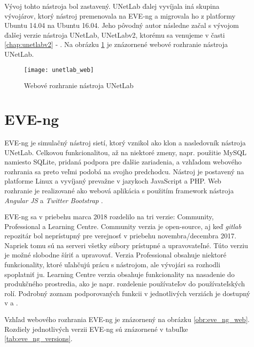 Vývoj tohto nástroja bol zastavený. UNetLab ďalej vyvíjala iná skupina vývojárov, ktorý nástroj premenovala na EVE-ng a migrovala ho z platformy Ubuntu 14.04 na Ubuntu 16.04. Jeho pôvodný autor následne začal s vývojom ďalšej verzie nástroja UNetLab, UNetLabv2, ktorému sa venujeme v časti \ref{chap:unetlabv2} - . Na obrázku \ref{obr:unetlab_web} je znázornené webové rozhranie nástroja UNetLab.

\begin{figure}
    \centering
    \texttt{[image: unetlab\_web]}
    \caption{Webové rozhranie nástroja UNetLab}
    \cite{obr_unetlab_web}
    \label{obr:unetlab_web}
\end{figure}





\section{EVE-ng}
\label{chap:virt_lab_eve_ng}

EVE-ng je simulačný nástroj sietí, ktorý vznikol ako klon a nasledovník nástroja UNetLab. Celkovou funkcionalitou, až na niektoré zmeny, napr. použitie MySQL namiesto SQLite, pridaná podpora pre ďalšie zariadenia, a vzhľadom webového rozhrania sa preto veľmi podobá na svojho predchodcu. Nástroj je postavený na platforme Linux a vyvíjaný prevažne v jazykoch JavaScript a PHP. Web rozhranie je realizované ako webová aplikácia s použitím framework nástroja \emph{Angular JS} a \emph{Twitter Bootstrap} \cite{eve_ng_technologies}.

EVE-ng sa v priebehu marca 2018 rozdelilo na tri verzie: Community, Professional a Learning Centre. Community verzia je open-source, aj keď \emph{gitlab} repozitár bol neprístupný pre verejnosť v priebehu novembra/decembra 2017. Napriek tomu sú na serveri všetky súbory prístupné a upravovateľné. Túto verziu je možné slobodne šíriť a upravovať. Verzia Professional obsahuje niektoré funkcionality, ktoré uľahčujú prácu s nástrojom, ale vývojári sa rozhodli spoplatniť ju. Learning Centre verzia obsahuje funkcionality na nasadenie do produkčného prostredia, ako je napr. rozdelenie používateľov do používateľských rolí. Podrobný zoznam podporovaných funkcii v jednotlivých verziách je dostupný v \cite{eve_ng_versions_table} a \cite{eve_ng_versions_list}.

Vzhľad webového rozhrania EVE-ng je znázornený na obrázku \ref{obr:eve_ng_web}. Rozdiely jednotlivých verzii EVE-ng sú znázornené v tabuľke \ref{tab:eve_ng_versions}.

